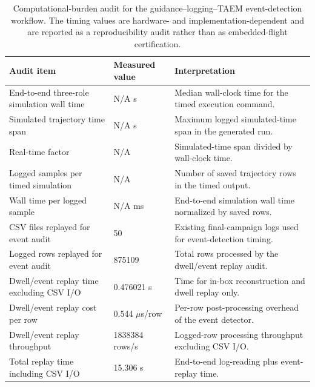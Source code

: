 \begin{table}[pos=htbp]
\centering
\scriptsize
\caption{Computational-burden audit for the guidance--logging--TAEM event-detection workflow. The timing values are hardware- and implementation-dependent and are reported as a reproducibility audit rather than as embedded-flight certification.}
\label{tab:computational_burden_audit}
\begin{tabular}{lll}
\hline
Audit item & Measured value & Interpretation \\
\hline
End-to-end three-role simulation wall time & N/A s & Median wall-clock time for the timed execution command. \\
Simulated trajectory time span & N/A s & Maximum logged simulated-time span in the generated run. \\
Real-time factor & N/A & Simulated-time span divided by wall-clock time. \\
Logged samples per timed simulation & N/A & Number of saved trajectory rows in the timed output. \\
Wall time per logged sample & N/A ms & End-to-end simulation wall time normalized by saved rows. \\
CSV files replayed for event audit & 50 & Existing final-campaign logs used for event-detection timing. \\
Logged rows replayed for event audit & 875109 & Total rows processed by the dwell/event replay audit. \\
Dwell/event replay time excluding CSV I/O & 0.476021 s & Time for in-box reconstruction and dwell replay only. \\
Dwell/event replay cost per row & 0.544 $\mu$s/row & Per-row post-processing overhead of the event detector. \\
Dwell/event replay throughput & 1838384 rows/s & Logged-row processing throughput excluding CSV I/O. \\
Total replay time including CSV I/O & 15.306 s & End-to-end log-reading plus event-replay time. \\
\hline
\end{tabular}
\end{table}
